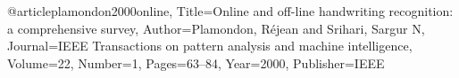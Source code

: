 @article{plamondon2000online,
	Title={Online and off-line handwriting recognition: a comprehensive survey},
	Author={Plamondon, R{\'e}jean and Srihari, Sargur N},
	Journal={IEEE Transactions on pattern analysis and machine intelligence},
	Volume={22},
	Number={1},
	Pages={63--84},
	Year={2000},
	Publisher={IEEE}
}
